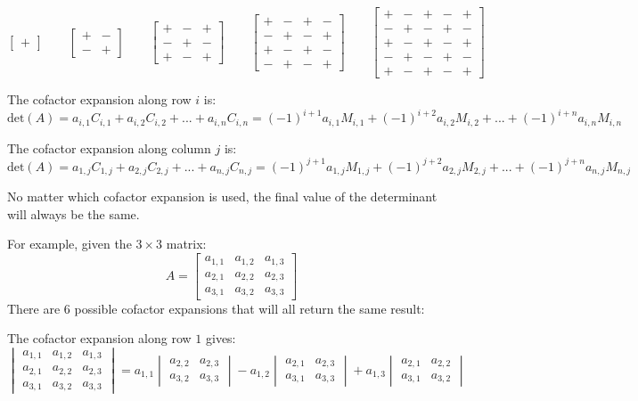 \documentclass{article}
\begin{document}
\[\begin{bmatrix}
+
\end{bmatrix} \quad\quad \begin{bmatrix}
+ & - \\ - & + 
\end{bmatrix} \quad\quad \begin{bmatrix}
+ & - & + \\ - & + & - \\ + & - & + 
\end{bmatrix} \quad\quad \begin{bmatrix}
+ & - & + & - \\ - & + & - & + \\ + & - & + & - \\ - & + & - & +  
\end{bmatrix} \quad\quad \begin{bmatrix}
+ & - & + & - & + \\ - & + & - & + & - \\ + & - & + & - & + \\ - & + & - & + & - \\ + & - & + & - & +  
\end{bmatrix}\]

The cofactor expansion along row \(i\) is:
\[\text{det}(A) = a_{i,1}C_{i,1} + a_{i,2}C_{i,2} + ... + a_{i,n}C_{i,n} = (-1)^{i + 1}a_{i,1}M_{i,1} + (-1)^{i + 2}a_{i,2}M_{i,2} + ... + (-1)^{i + n}a_{i,n}M_{i,n}\]

The cofactor expansion along column \(j\) is: 
\[\text{det}(A) = a_{1,j}C_{1,j} + a_{2,j}C_{2,j} + ... + a_{n,j}C_{n,j} = (-1)^{j + 1}a_{1,j}M_{1,j} + (-1)^{j + 2}a_{2,j}M_{2,j} + ... + (-1)^{j + n}a_{n,j}M_{n,j}\]

No matter which cofactor expansion is used, the final value of the determinant will always be the same. 

For example, given the \(3 \times 3\) matrix: 
\[A = \begin{bmatrix}
a_{1,1} & a_{1,2} & a_{1,3} \\ 
a_{2,1} & a_{2,2} & a_{2,3} \\ 
a_{3,1} & a_{3,2} & a_{3,3} 
\end{bmatrix}\]
There are \(6\) possible cofactor expansions that will all return the same result:

The cofactor expansion along row \(1\) gives:
\[\begin{vmatrix}
a_{1,1} & a_{1,2} & a_{1,3} \\ 
a_{2,1} & a_{2,2} & a_{2,3} \\ 
a_{3,1} & a_{3,2} & a_{3,3} 
\end{vmatrix} = a_{1,1}\begin{vmatrix}
a_{2,2} & a_{2,3} \\ 
a_{3,2} & a_{3,3} 
\end{vmatrix} - a_{1,2}\begin{vmatrix}
a_{2,1} & a_{2,3} \\ 
a_{3,1} & a_{3,3} 
\end{vmatrix} + a_{1,3}\begin{vmatrix}
a_{2,1} & a_{2,2} \\ 
a_{3,1} & a_{3,2}  
\end{vmatrix}\]
\end{document}
